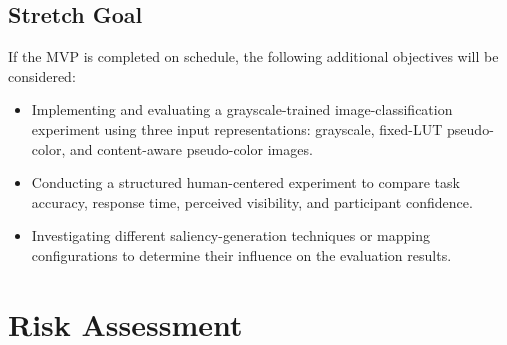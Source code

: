 \documentclass[11pt]{article}
\begin{document}

\subsection{Stretch Goal}

If the MVP is completed on schedule, the following additional objectives will be considered:
\begin{itemize}[leftmargin=*]

    \item Implementing and evaluating a grayscale-trained image-classification experiment using three input representations: grayscale, fixed-LUT pseudo-color, and content-aware pseudo-color images.
    \item Conducting a structured human-centered experiment to compare task accuracy, response time, perceived visibility, and participant confidence.
    \item Investigating different saliency-generation techniques or mapping configurations to determine their influence on the evaluation results.
\end{itemize}


\section{Risk Assessment}
\label{sec:risk}
\end{document}
